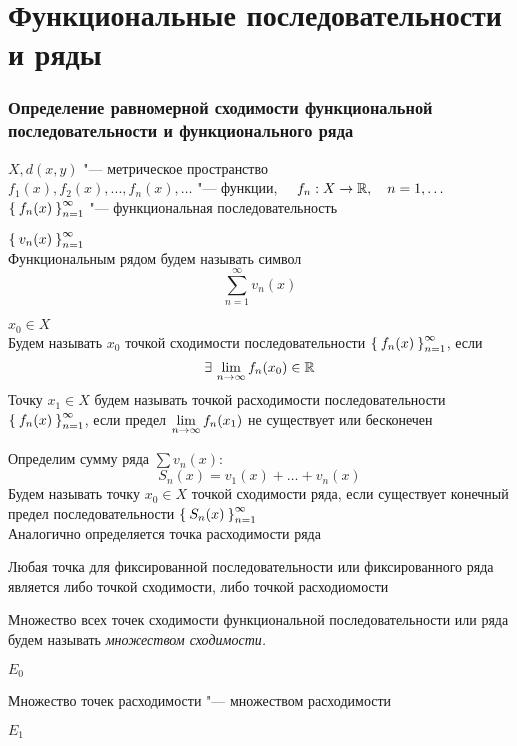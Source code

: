 \part{Функциональные последовательности и ряды}

\section{Определение равномерной сходимости функциональной последовательности и функционального ряда}

\begin{definition}
	$ X, d(x, y) $ "--- метрическое пространство \\
	$ f_1(x), f_2(x), ..., f_n(x), \dots $ "--- функции, $ \quad f_n : X \to \mathbb{R}, \quad n = 1, \dots $ \\
	$ \Set{f_n(x)}_{n=1}^{\infty} $ "--- функциональная последовательность
\end{definition}

\begin{definition}
	$ \Set{v_n(x)}_{n=1}^{\infty} $ \\
	Функциональным рядом будем называть символ
	$$ \sum_{n = 1}^\infty v_n(x) $$
\end{definition}

\begin{definition}
	$ x_0 \in X $ \\
	Будем называть $ x_0 $ точкой сходимости последовательности $ \Set{f_n(x)}_{n=1}^{\infty} $, если
	$$ \exists\, \lim\limits_{n \to \infty}f_n(x_0) \in \mathbb{R} $$
	Точку $ x_1 \in X $ будем называть точкой расходимости последовательности $ \Set{f_n(x)}_{n=1}^{\infty} $, если предел $ \lim\limits_{n\to\infty} f_n(x_1) $ не существует или бесконечен
\end{definition}

\begin{definition}
	Определим сумму ряда $ \sum v_n(x) $:
	$$ S_n(x) = v_1(x) + \dots + v_n(x) $$
	Будем называть точку $ x_0 \in X $ точкой сходимости ряда, если существует конечный предел последовательности $ \Set{S_n(x)}_{n=1}^{\infty} $ \\
	Аналогично определяется точка расходимости ряда
\end{definition}

\begin{remark}
	Любая точка для фиксированной последовательности или фиксированного ряда является либо точкой сходимости, либо точкой расходиомости
\end{remark}

\begin{definition}
	Множество всех точек сходимости функциональной последовательности или ряда будем называть \it{множеством сходимости}.
	\begin{notation}
		$ E_0 $
	\end{notation}
	Множество точек расходимости "--- множеством расходимости
	\begin{notation}
		$ E_1 $
	\end{notation}
\end{definition}

